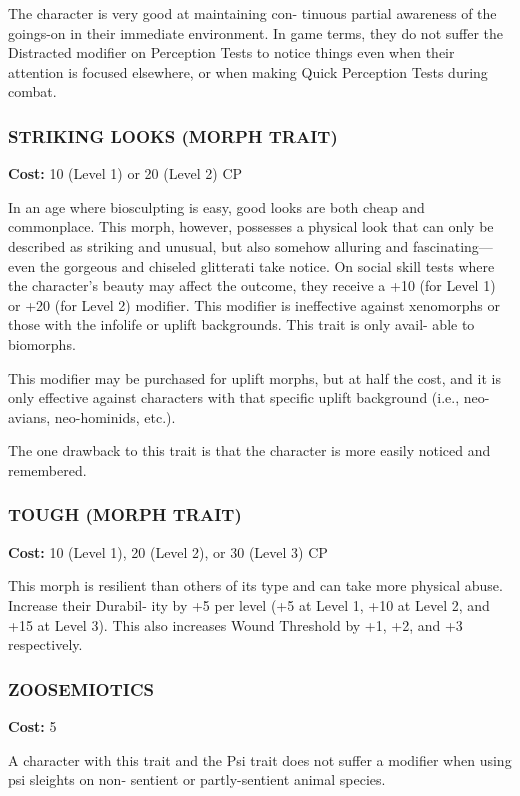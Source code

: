 The character is very good at maintaining con-
tinuous partial awareness of the goings-on in their
immediate environment. In game terms, they do not
suffer the Distracted modifier on Perception Tests
to notice things even when their attention is focused
elsewhere, or when making Quick Perception Tests
during combat.

\subsubsection{STRIKING LOOKS (MORPH TRAIT)}
\textbf{Cost:} 10 (Level 1) or 20 (Level 2) CP

In an age where biosculpting is easy, good looks are
both cheap and commonplace. This morph, however,
possesses a physical look that can only be described as
striking and unusual, but also somehow alluring and
fascinating—even the gorgeous and chiseled glitterati
take notice. On social skill tests where the character’s
beauty may affect the outcome, they receive a +10 (for
Level 1) or +20 (for Level 2) modifier. This modifier
is ineffective against xenomorphs or those with the
infolife or uplift backgrounds. This trait is only avail-
able to biomorphs.

This modifier may be purchased for uplift morphs,
but at half the cost, and it is only effective against
characters with that specific uplift background (i.e.,
neo-avians, neo-hominids, etc.).

The one drawback to this trait is that the character
is more easily noticed and remembered.

\subsubsection{TOUGH (MORPH TRAIT)}
\textbf{Cost:} 10 (Level 1), 20 (Level 2), or 30 (Level 3) CP

This morph is resilient than others of its type and
can take more physical abuse. Increase their Durabil-
ity by +5 per level (+5 at Level 1, +10 at Level 2, and
+15 at Level 3). This also increases Wound Threshold
by +1, +2, and +3 respectively.

\subsubsection{ZOOSEMIOTICS}
\textbf{Cost:} 5

A character with this trait and the Psi trait does
not suffer a modifier when using psi sleights on non-
sentient or partly-sentient animal species.

